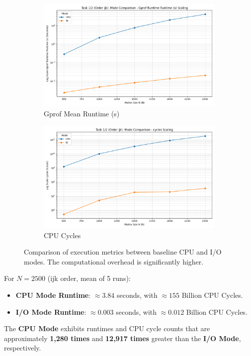 \documentclass[11pt, a4paper]{article}
\begin{document}
\begin{figure}[h] %
    \centering
    \begin{subfigure}[b]{0.48\textwidth}
        \centering
        \includegraphics[width=\textwidth]{plots/task_1_2_(order_ijk)_mode_comparison_-__gprof_runtime_mean_s.png}
        \caption{Gprof Mean Runtime (s)}
        \label{fig:t1_gprof_runtime_comp}
    \end{subfigure}
    \hfill
    \begin{subfigure}[b]{0.48\textwidth}
        \centering
        \includegraphics[width=\textwidth]{plots/task_1_2_(order_ijk)_mode_comparison_-__cycles.png}
        \caption{CPU Cycles}
        \label{fig:t1_cycles_comp}
    \end{subfigure}
    \caption{Comparison of execution metrics between baseline CPU and I/O modes. The computational overhead is significantly higher.}
\end{figure}

For $N=2500$ (ijk order, mean of 5 runs):
\begin{itemize}
    \item \textbf{CPU Mode Runtime}: $\approx 3.84$ seconds, with $\approx 155$ Billion CPU Cycles.
    \item \textbf{I/O Mode Runtime}: $\approx 0.003$ seconds, with $\approx 0.012$ Billion CPU Cycles.
\end{itemize}
The \textbf{CPU Mode} exhibits runtimes and CPU cycle counts that are approximately \textbf{1,280 times} and \textbf{12,917 times} greater than the \textbf{I/O Mode}, respectively.
\end{document}

